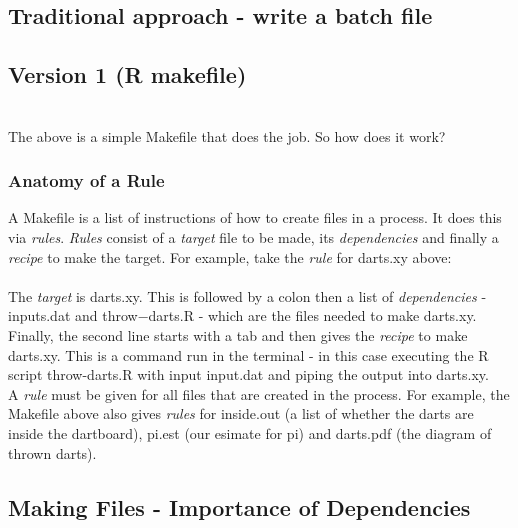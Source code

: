 \documentclass[12pt]{article}\usepackage[]{graphicx}\usepackage[]{color}
\begin{document}
\subsection{Traditional approach - write a batch file}



\lstset{language=sh}
\fbox{}

\subsection{Version 1 (R makefile)}


\fbox{}\\

The above is a simple Makefile that does the job. So how does it work?\\

\subsubsection{Anatomy of a Rule}

A Makefile is a list of instructions of how to create files in a process. It does this via \emph{rules}. \emph{Rules} consist of a \emph{target} file to be made, its \emph{dependencies} and finally a \emph{recipe} to make the target. For example, take the \emph{rule} for darts.xy above:\\
\fbox{}\\

The \emph{target} is darts.xy. This is followed by a colon then a list of \emph{dependencies} - inputs.dat and throw−darts.R - which are the files needed to make darts.xy. Finally, the second line starts with a tab and then gives the \emph{recipe} to make darts.xy. This is a command run in the terminal - in this case executing the R script throw-darts.R with input input.dat and piping the output into darts.xy.\\

A \emph{rule} must be given for all files that are created in the process. For example, the Makefile above also gives \emph{rules} for inside.out (a list of whether the darts are inside the dartboard), pi.est (our esimate for pi) and darts.pdf (the diagram of thrown darts).

\subsection{Making Files - Importance of Dependencies}
\end{document}

